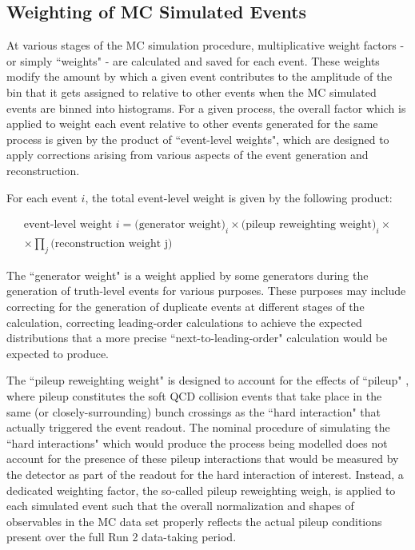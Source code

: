 \subsection{Weighting of MC Simulated Events}
\label{sec:evt_wts}

At various stages of the MC simulation procedure, multiplicative weight factors - or simply ``weights" - are calculated and saved for each event. These weights modify the amount by which a given event contributes to the amplitude of the bin that it gets assigned to relative to other events when the MC simulated events are binned into histograms. For a given process, the overall factor which is applied to weight each event relative to other events generated for the same process is given by the product of ``event-level weights", which are designed to apply corrections arising from various aspects of the event generation and reconstruction. 

For each event $i$, the total event-level weight is given by the following product:

\begin{multline}
\label{eq:evt_wt}
\text{event-level weight }i = \text{(generator weight)}_i \times \text{(pileup reweighting weight)}_i \times \\ \times \prod_j \text{(reconstruction weight j)}
\end{multline}

The ``generator weight" is a weight applied by some generators during the generation of truth-level events for various purposes. These purposes may include correcting for the generation of duplicate events at different stages of the calculation, correcting leading-order calculations to achieve the expected distributions that a more precise ``next-to-leading-order" calculation would be expected to produce. 

The ``pileup reweighting weight" is designed to account for the effects of ``pileup" \cite{pileup}, where pileup constitutes the soft QCD collision events that take place in the same (or closely-surrounding) bunch crossings as the ``hard interaction" that actually triggered the event readout. The nominal procedure of simulating the ``hard interactions" which would produce the process being modelled does not account for the presence of these pileup interactions that would be measured by the detector as part of the readout for the hard interaction of interest. Instead, a dedicated weighting factor, the so-called pileup reweighting weigh, is applied to each simulated event such that the overall normalization and shapes of observables in the MC data set properly reflects the actual pileup conditions present over the full Run 2 data-taking period.

